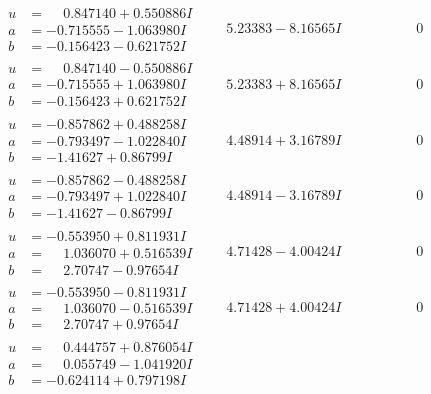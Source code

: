 \documentclass[1p]{elsarticle_modified}
\theoremstyle{definition}
\begin{document}
$$\begin{array}{c|c|c}
\begin{aligned}
u &= \phantom{-}0.847140 + 0.550886 I \\
a &= -0.715555 - 1.063980 I \\
b &= -0.156423 - 0.621752 I\end{aligned}
 & \phantom{-}5.23383 - 8.16565 I & \phantom{-0.000000 } 0 \\ \hline\begin{aligned}
u &= \phantom{-}0.847140 - 0.550886 I \\
a &= -0.715555 + 1.063980 I \\
b &= -0.156423 + 0.621752 I\end{aligned}
 & \phantom{-}5.23383 + 8.16565 I & \phantom{-0.000000 } 0 \\ \hline\begin{aligned}
u &= -0.857862 + 0.488258 I \\
a &= -0.793497 - 1.022840 I \\
b &= -1.41627 + 0.86799 I\end{aligned}
 & \phantom{-}4.48914 + 3.16789 I & \phantom{-0.000000 } 0 \\ \hline\begin{aligned}
u &= -0.857862 - 0.488258 I \\
a &= -0.793497 + 1.022840 I \\
b &= -1.41627 - 0.86799 I\end{aligned}
 & \phantom{-}4.48914 - 3.16789 I & \phantom{-0.000000 } 0 \\ \hline\begin{aligned}
u &= -0.553950 + 0.811931 I \\
a &= \phantom{-}1.036070 + 0.516539 I \\
b &= \phantom{-}2.70747 - 0.97654 I\end{aligned}
 & \phantom{-}4.71428 - 4.00424 I & \phantom{-0.000000 } 0 \\ \hline\begin{aligned}
u &= -0.553950 - 0.811931 I \\
a &= \phantom{-}1.036070 - 0.516539 I \\
b &= \phantom{-}2.70747 + 0.97654 I\end{aligned}
 & \phantom{-}4.71428 + 4.00424 I & \phantom{-0.000000 } 0 \\ \hline\begin{aligned}
u &= \phantom{-}0.444757 + 0.876054 I \\
a &= \phantom{-}0.055749 - 1.041920 I \\
b &= -0.624114 + 0.797198 I\end{aligned}

\end{array}$$
\end{document}
